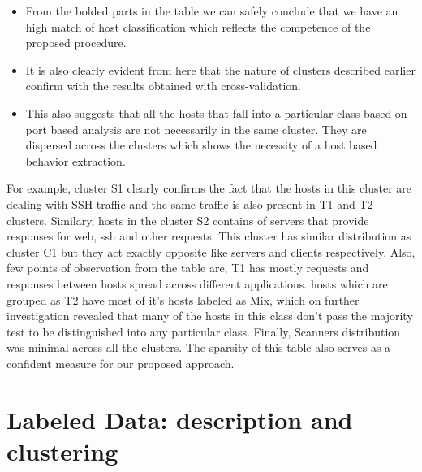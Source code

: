 \begin{itemize}
	\item From the bolded parts in the table we can safely conclude that we have an high match of host classification which reflects the competence of the proposed procedure.
	
	\item  It is also clearly evident from here that the nature of clusters described earlier confirm with the results obtained with cross-validation.
	
	\item This also suggests that all the hosts that fall into a particular class based on port based analysis are not necessarily in the same cluster. They are dispersed across the clusters which shows the necessity of a host based behavior extraction.	
\end{itemize}
  For example, cluster S1 clearly confirms the fact that the hosts in this cluster are dealing with SSH traffic and the same traffic is also present in T1 and T2 clusters. Similary, hosts in the cluster S2 contains of servers that provide responses for web, ssh and other requests. This cluster has similar distribution as cluster C1 but they act exactly opposite like servers and clients respectively. Also, few points of observation from the table are, T1 has mostly requests and responses between hosts spread across different applications. hosts which are grouped as T2 have most of it's hosts labeled as Mix, which on further investigation revealed that many of the hosts in this class don't pass the majority test to be distinguished into any particular class. Finally, Scanners distribution was minimal across all the clusters. The sparsity of this table also serves as a confident measure for our proposed approach.

\section{Labeled Data: description and clustering}

